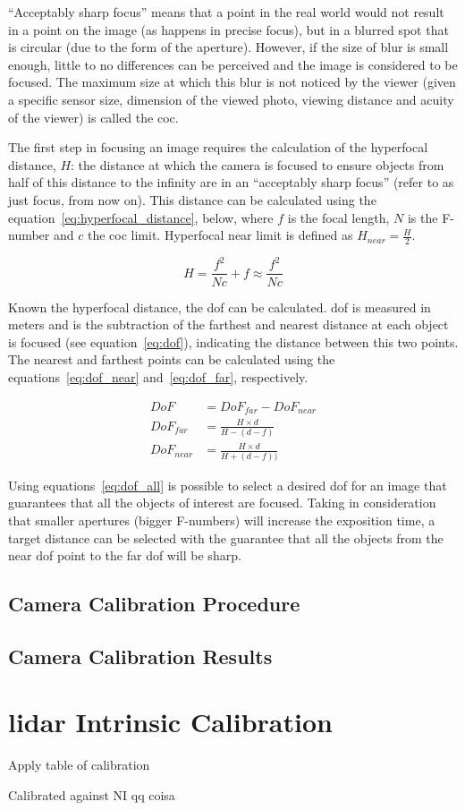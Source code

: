 ``Acceptably sharp focus'' means that a point in the real world would not result in a point on the image (as happens in precise focus), but in a blurred spot that is circular (due to the form of the aperture)\cite{Photopillers}. However, if the size of blur is small enough, little to no differences can be perceived and the image is considered to be focused\cite{Photopillers}. The maximum size at which this blur is not noticed by the viewer (given a specific sensor size, dimension of the viewed photo, viewing distance and acuity of the viewer) is called the \ac{coc}\cite{Photopillers, Merklinger1993}.

The first step in focusing an image requires the calculation of the hyperfocal distance, $H$: the distance at which the camera is focused to ensure objects from half of this distance to the infinity are in an ``acceptably sharp focus'' (refer to as just focus, from now on). This distance can be calculated using the equation~\ref{eq:hyperfocal_distance}, below, where $f$ is the focal length, $N$ is the F-number and $c$ the \ac{coc} limit. Hyperfocal near limit is defined as $H_{near} = \frac{H}{2}$.

\begin{equation}
	\label{eq:hyperfocal_distance}
	H = \frac{f^2}{Nc} + f \approx \frac{f^2}{Nc} 
\end{equation}

Known the hyperfocal distance, the \acf{dof} can be calculated. \ac{dof} is measured in meters and is the subtraction of the farthest and nearest distance at each object is focused (see equation~\ref{eq:dof}), indicating the distance between this two points\cite{Photopillers, Merklinger1993, mvg_book}. The nearest and farthest points can be calculated using the equations~\ref{eq:dof_near} and~\ref{eq:dof_far}, respectively.

\begin{subequations}
	\label{eq:dof_all}
	\begin{align}
		DoF & = DoF_{far} - DoF_{near} \label{eq:dof} \\
		DoF_{far} & = \frac{H\times d}{H - (d - f)} \label{eq:dof_far} \\
		DoF_{near} & = \frac{H\times d}{H + (d - f))} \label{eq:dof_near} 
	\end{align}
\end{subequations}

Using equations~\ref{eq:dof_all} is possible to select a desired \acl{dof} for an image that guarantees that all the objects of interest are focused. Taking in consideration that smaller apertures (bigger F-numbers) will increase the exposition time\cite{Merklinger1993}, a target distance can be selected with the guarantee that all the objects from the near \ac{dof} point to the far \ac{dof} will be sharp.

\subsection{Camera Calibration Procedure}

\subsection{Camera Calibration Results}

\section{\ac{lidar} Intrinsic Calibration}
Apply table of calibration 

Calibrated against NI qq coisa
